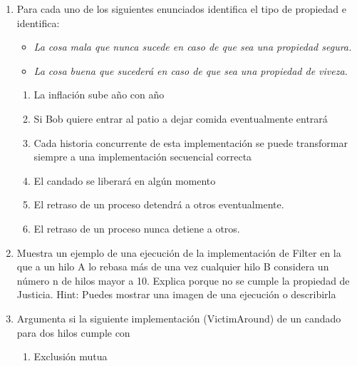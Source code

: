 \begin{enumerate}
    \item Para cada uno de los siguientes enunciados identifica el tipo de propiedad e identifica:

    \begin{itemize}
        \item \textit{La cosa mala que nunca sucede en caso de que sea una propiedad segura.}

        \item \textit{La cosa buena que sucederá en caso de que sea una propiedad de viveza.}
    \end{itemize}

    \begin{enumerate}
        \item La inflación sube año con año
        
        \item Si Bob quiere entrar al patio a dejar comida eventualmente entrará
        
        \item Cada historia concurrente de esta implementación se puede transformar siempre a una implementación secuencial correcta
        
        \item El candado se liberará en algún momento

        \item El retraso de un proceso detendrá a otros eventualmente.

        \item El retraso de un proceso nunca detiene a otros.

    \end{enumerate}

    \hfill

    \item Muestra un ejemplo de una ejecución de la implementación de Filter en la que a un hilo A lo rebasa más de una vez cualquier hilo B considera un número n de hilos mayor a 10. Explica porque no se cumple la propiedad de Justicia. Hint: Puedes mostrar una imagen de una ejecución o describirla

    \hfill

    \item Argumenta si la siguiente implementación (VictimAround) de un candado para dos hilos cumple con

    \begin{enumerate}
        \item Exclusión mutua


\end{enumerate}
\end{enumerate}
